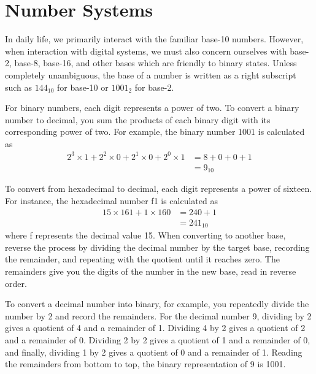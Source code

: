 \section{Number Systems}
In daily life, we primarily interact with the familiar
base-10 numbers. However, when interaction with digital
systems, we must also concern ourselves with base-2, base-8,
base-16, and other bases which are friendly to binary
states. Unless completely unambiguous, the base of a number
is written as a right subscript such as $144_{10}$ for base-10
or $1001_{2}$ for base-2.

For binary numbers, each digit represents a power of two.
To convert a binary number to decimal, you sum the products of
each binary digit with its corresponding power of two. For
example, the binary number 1001 is calculated as
\begin{align}
    2^3 \times 1 + 2^2 \times 0 + 2^1 \times 0 + 2^0 \times 1 & = 8 + 0 + 0 + 1 \\
                                                              & = 9_{10}
\end{align}

To convert from hexadecimal to decimal, each digit represents a
power of sixteen. For instance, the hexadecimal number f1 is
calculated as
\begin{align}
    15 \times 161+1 \times 160 & = 240+1    \\
                               & = 241_{10}
\end{align}
where f represents the decimal value 15.
When converting to another base, reverse the process by dividing
the decimal number by the target base, recording the remainder,
and repeating with the quotient until it reaches zero.
The remainders give you the digits of the number in the new
base, read in reverse order.

To convert a decimal number into binary, for example, you
repeatedly divide the number by 2 and record the remainders.
For the decimal number 9, dividing by 2 gives a quotient of 4
and a remainder of 1. Dividing 4 by 2 gives a quotient of 2
and a remainder of 0. Dividing 2 by 2 gives a quotient of 1
and a remainder of 0, and finally, dividing 1 by 2 gives a
quotient of 0 and a remainder of 1. Reading the remainders
from bottom to top, the binary representation of 9 is 1001.